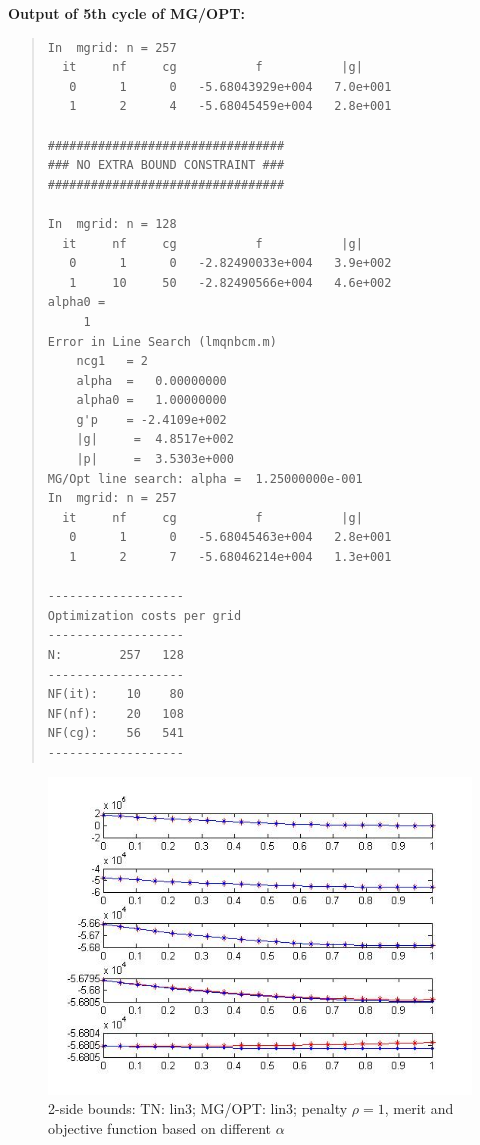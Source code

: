 \documentclass[10pt]{article}
\begin{document}
\bf{Output of 5th cycle of MG/OPT:}
\begin{quote}
\begin{verbatim}
In  mgrid: n = 257
  it     nf     cg           f           |g|
   0      1      0   -5.68043929e+004   7.0e+001
   1      2      4   -5.68045459e+004   2.8e+001
 
#################################
### NO EXTRA BOUND CONSTRAINT ###
#################################
 
In  mgrid: n = 128
  it     nf     cg           f           |g|
   0      1      0   -2.82490033e+004   3.9e+002
   1     10     50   -2.82490566e+004   4.6e+002
alpha0 =
     1
Error in Line Search (lmqnbcm.m)
    ncg1   = 2
    alpha  =   0.00000000
    alpha0 =   1.00000000
    g'p    = -2.4109e+002
    |g|     =  4.8517e+002
    |p|     =  3.5303e+000
MG/Opt line search: alpha =  1.25000000e-001
In  mgrid: n = 257
  it     nf     cg           f           |g|
   0      1      0   -5.68045463e+004   2.8e+001
   1      2      7   -5.68046214e+004   1.3e+001

-------------------
Optimization costs per grid
-------------------
N:        257   128
-------------------
NF(it):    10    80
NF(nf):    20   108
NF(cg):    56   541
-------------------

\end{verbatim}
\end{quote}


\begin{figure}
  \centering
  \includegraphics[width=1\textwidth]{merit33}
  \caption{2-side bounds: TN: lin3; MG/OPT: lin3; penalty $\rho=1$, merit and objective function based on different $\alpha$}
  \label{fig:merit33}
\end{figure}
\end{document}

